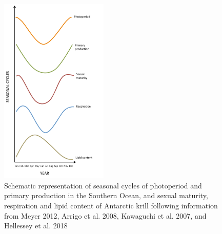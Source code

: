 \begin{figure}
        \centering
        \includegraphics[height=9cm,keepaspectratio]{../Figures/Figure2.pdf}
        \caption{Schematic representation of seasonal cycles of photoperiod and
        primary production in the Southern Ocean, and sexual maturity,
        respiration and lipid content of Antarctic krill following information
        from Meyer 2012, Arrigo et al. 2008, Kawaguchi et al. 2007, and
        Hellessey et al. 2018}
        \label{figure2}
\end{figure}

